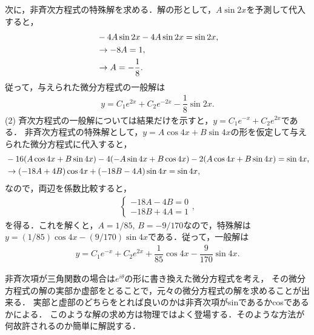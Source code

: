 次に，非斉次方程式の特殊解を求める．解の形として，$A\sin 2x$を予測して代入すると，
\begin{align}
  & -4A \sin 2x - 4 A \sin 2x = \sin 2x, \notag \\
  & \rightarrow -8 A = 1, \notag \\
  & \rightarrow    A = -\dfrac{1}{8}. 
\end{align} 
従って，与えられた微分方程式の一般解は
\begin{align}
  y = C_1 e^{2x} + C_2 e^{-2x} - \dfrac{1}{8}\sin 2x.  
\end{align}
%
(2)
斉次方程式の一般解については結果だけを示すと，$y = C_1 e^{-x} + C_2 e^{2x}$である．
非斉次方程式の特殊解として，$y = A\cos 4x + B\sin 4x$の形を仮定して与えられた微分方程式に代入すると，
\begin{align}
 & -16(A \cos 4x + B \sin 4x ) -4 (- A \sin 4x + B \cos 4x) - 2 (A\cos 4x + B\sin 4x)= \sin 4x, \notag \\
 & \rightarrow (-18 A + 4B)\cos 4x + (-18 B -4A)\sin 4x = \sin 4x, 
\end{align}
なので，両辺を係数比較すると，
\begin{align}
  \begin{cases}
    -18 A - 4B = 0 \\ 
    -18 B + 4A = 1 
  \end{cases},
\end{align}
を得る．これを解くと，$A=1/85$, $B=-9/170$なので，特殊解は$y=(1/85)\cos 4x - (9/170)\sin 4x$である．従って，一般解は
\begin{align}
 y = C_1 e^{-x} + C_2 e^{2x} + \dfrac{1}{85} \cos 4x - \dfrac{9}{170}\sin 4x.
\end{align}

\noindent
{}

非斉次項が三角関数の場合は$e^{i\theta}$の形に書き換えた微分方程式を考え，
その微分方程式の解の実部か虚部をとることで，元々の微分方程式の解を求めることが出来る．
実部と虚部のどちらをとれば良いのかは非斉次項がsinであるかcosであるかによる．
このような解の求め方は物理ではよく登場する．そのような方法が何故許されるのか簡単に解説する．

